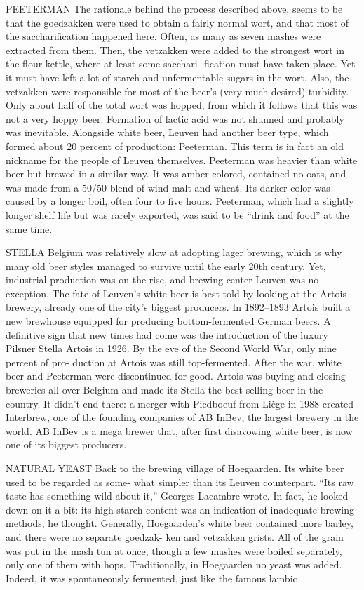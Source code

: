 \documentclass[a4paper,parskip=half]{scrartcl}
\begin{document}
PEETERMAN
The rationale behind the process described
above, seems to be that the goedzakken were
used to obtain a fairly normal wort, and
that most of the saccharification happened
here. Often, as many as seven mashes were
extracted from them. Then, the vetzakken
were added to the strongest wort in the
flour kettle, where at least some sacchari-
fication must have taken place. Yet it must
have left a lot of starch and unfermentable
sugars in the wort. Also, the vetzakken were
responsible for most of the beer’s (very
much desired) turbidity. Only about half of
the total wort was hopped, from which it
follows that this was not a very hoppy beer.
Formation of lactic acid was not shunned
and probably was inevitable.
Alongside white beer, Leuven had another
beer type, which formed about 20 percent
of production: Peeterman. This term is in
fact an old nickname for the people of
Leuven themselves. Peeterman was heavier
than white beer but brewed in a similar way.
It was amber colored, contained no oats,
and was made from a 50/50 blend of wind
malt and wheat. Its darker color was caused
by a longer boil, often four to five hours.
Peeterman, which had a slightly longer shelf
life but was rarely exported, was said to be
“drink and food” at the same time.

STELLA
Belgium was relatively slow at adopting
lager brewing, which is why many old beer
styles managed to survive until the early
20th century. Yet, industrial production
was on the rise, and brewing center Leuven
was no exception.
The fate of Leuven’s white beer is best told
by looking at the Artois brewery, already one
of the city’s biggest producers. In 1892–1893
Artois built a new brewhouse equipped for
producing bottom-fermented German beers.
A definitive sign that new times had come
was the introduction of the luxury Pilsner
Stella Artois in 1926. By the eve of the
Second World War, only nine percent of pro-
duction at Artois was still top-fermented.
After the war, white beer and Peeterman
were discontinued for good. Artois was
buying and closing breweries all over
Belgium and made its Stella the best-selling
beer in the country. It didn’t end there: a
merger with Piedboeuf from Liège in 1988
created Interbrew, one of the founding
companies of AB InBev, the largest brewery
in the world. AB InBev is a mega brewer
that, after first disavowing white beer, is
now one of its biggest producers.

NATURAL YEAST
Back to the brewing village of Hoegaarden.
Its white beer used to be regarded as some-
what simpler than its Leuven counterpart.
“Its raw taste has something wild about
it,” Georges Lacambre wrote. In fact, he
looked down on it a bit: its high starch
content was an indication of inadequate
brewing methods, he thought. Generally,
Hoegaarden’s white beer contained more
barley, and there were no separate goedzak-
ken and vetzakken grists. All of the grain
was put in the mash tun at once, though
a few mashes were boiled separately, only
one of them with hops.
Traditionally, in Hoegaarden no yeast
was added. Indeed, it was spontaneously
fermented, just like the famous lambic
\end{document}
